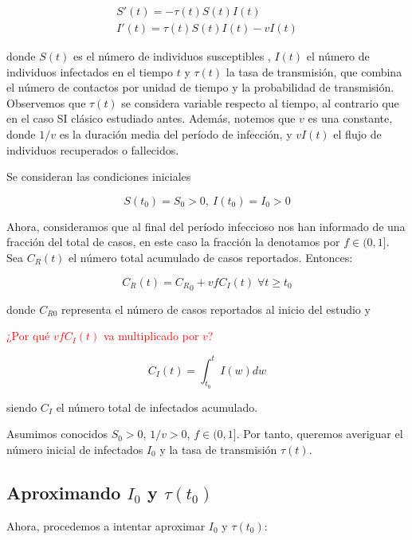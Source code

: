 \begin{equation}
\label{eqn: SI_cont}
\begin{aligned}
S'(t) = -\tau (t)S(t)I(t) \\
I'(t) = \tau (t)S(t)I(t) -vI(t)
\end{aligned}
\end{equation}

donde $S(t)$ es el número de individuos susceptibles , $I(t)$ el número de individuos infectados en el tiempo $t$ y $\tau (t)$ la tasa de transmisión, que combina el número de contactos por unidad de tiempo y la probabilidad de transmisión. Observemos que $\tau (t)$ se considera variable respecto al tiempo, al contrario que en el caso SI clásico estudiado antes. Además, notemos que $v$ es una constante, donde $1/v$ es la duración media del período de infección, y $vI(t)$ el flujo de individuos recuperados o fallecidos. %

Se consideran las condiciones iniciales

$$S(t_0)=S_0>0, \: I(t_0)=I_0>0$$

Ahora, consideramos que al final del período infeccioso nos han informado de una fracción del total de casos, en este caso la fracción la denotamos por $f\in (0,1]$. Sea $C_R(t)$ el número total acumulado de casos reportados. Entonces:

\begin{equation}
\label{eqn: acumulada}
C_R(t) = {C_R}_0 + vfC_I(t) \; \forall t \geq t_0
\end{equation}

donde $C_{R0}$ representa el número de casos reportados al inicio del estudio y 

\textcolor{red}{¿Por qué $vfC_I(t)$ va multiplicado por $v$?}

$$C_I(t) = \int_{t_0}^t I(w) dw $$

siendo $C_I$ el número total de infectados acumulado.

Asumimos conocidos $S_0 > 0$, $1/v>0$, $f\in (0,1]$. Por tanto, queremos averiguar el número inicial de infectados $I_0$ y la tasa de transmisión $\tau (t)$.

\subsection{Aproximando $I_0$ y $\tau (t_0)$}
Ahora, procedemos a intentar aproximar $I_0$ y $\tau (t_0)$:

